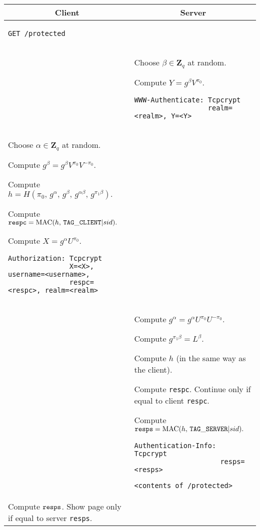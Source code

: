 \documentclass[10pt]{article}
\begin{document}
\begin{tabular}{p{9cm} | p{9cm}}
\multicolumn{1}{c}{\bf Client} & \multicolumn{1}{c}{\bf Server} \\
\hline
\begin{verbatim}
GET /protected
\end{verbatim} \\

& Choose $\beta \in \mathbf{Z}_q$ at random.

Compute $Y=g^\beta V^{\pi_0}.$

\begin{verbatim}
WWW-Authenticate: Tcpcrypt 
                  realm=<realm>, Y=<Y>
\end{verbatim} \\

Choose $\alpha \in \mathbf{Z}_q$ at random.

Compute $g^\beta = g^\beta V^{\pi_0} V^{-\pi_0}.$

Compute $h = H(\pi_0,\, g^\alpha,\, g^\beta,\, g^{\alpha \beta},\, g^{\pi_1 \beta}).$

Compute ${\tt respc} = \operatorname{MAC}(h,\, {\tt TAG\_CLIENT} | sid).$

Compute $X=g^\alpha U^{\pi_0}.$

\begin{verbatim}
Authorization: Tcpcrypt 
               X=<X>, username=<username>,
               respc=<respc>, realm=<realm>
\end{verbatim}

& \\

& Compute $g^\alpha = g^\alpha U^{\pi_0} U^{-\pi_0}.$

Compute $g^{\pi_1 \beta} = L^\beta.$

Compute $h$ (in the same way as the client).

Compute {\tt respc}. Continue only if equal to client {\tt respc}.

Compute ${\tt resps} = \operatorname{MAC}(h,\, {\tt TAG\_SERVER} | sid).$
\begin{verbatim}
Authentication-Info: Tcpcrypt 
                     resps=<resps>

<contents of /protected>
\end{verbatim} \\

Compute ${\tt resps}$. Show page only if equal to server {\tt resps}.
\end{tabular}
\end{document}
